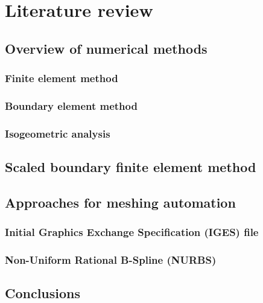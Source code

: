 
\chapter{Literature review}

\section{Overview of numerical methods}

    \subsection{Finite element method}

    \subsection{Boundary element method}

    \subsection{Isogeometric analysis}

\section{Scaled boundary finite element method}

\section{Approaches for meshing automation}

    \subsection{Initial Graphics Exchange Specification (IGES) file}
    \label{lr_sc:iges}

    \subsection{Non-Uniform Rational B-Spline (NURBS)}

\section{Conclusions}